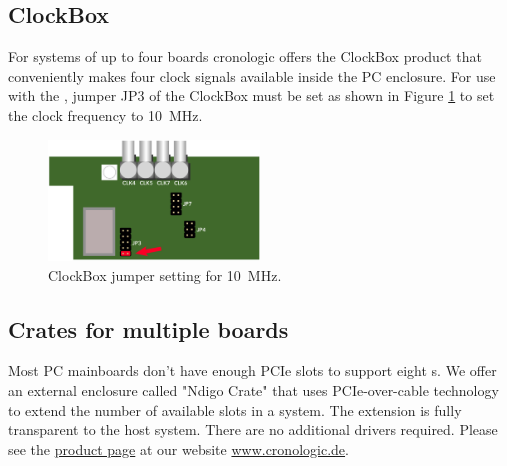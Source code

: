 {		\subsection{ClockBox}
			For systems of up to four boards cronologic offers the ClockBox product that conveniently makes four clock signals available 
			inside the PC enclosure. For use with the \deviceName, jumper JP3 of the ClockBox must be set as shown in Figure \ref{fig:clockbox} to set the clock frequency to \SI{10}{\mega\hertz}. 
			\begin{figure}[ht]
				\begin{center}
					\includegraphics[width=0.5\textwidth]{xhptdc/figures/clockbox.pdf}				
					\caption{ClockBox jumper setting for \SI{10}{\mega\hertz}.\label{fig:clockbox}}
				\end{center} 
			\end{figure}
		
		\subsection{Crates for multiple boards}
			Most PC mainboards don't have enough PCIe slots to support eight \deviceName s. 
			We offer an external enclosure called "Ndigo Crate" that uses PCIe-over-cable technology to extend the number of available slots in a system.
			The extension is fully transparent to the host system. There are no additional drivers required. 
			Please see the \href{https://www.cronologic.de/products/pcie/pcie-crates}{product page} at our website \url{www.cronologic.de}.
}{}




	


